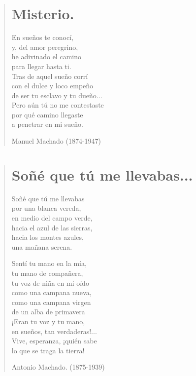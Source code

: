 \documentclass[12pt, twoside]{book}
\begin{document}
\begin{verse}
\begin{center}
\section{Misterio.}
\end{center}

En sueños te conocí,\\
y, del amor peregrino,\\
he adivinado el camino\\
para llegar hasta ti.\\
Tras de aquel sueño corrí\\
con el dulce y loco empeño\\
de ser tu esclavo y tu dueño...\\
Pero aún tú no me contestaste\\
por qué camino llegaste\\
a penetrar en mi sueño.\newline

Manuel Machado (1874-1947)

\end{verse}
\newpage

\begin{verse}
\begin{center}
\section{Soñé que tú me llevabas...}
\end{center}

Soñé que tú me llevabas\\
por una blanca vereda,\\
en medio del campo verde,\\
hacia el azul de las sierras,\\
hacia los montes azules,\\
una mañana serena.\newline

Sentí tu mano en la mía,\\
tu mano de compañera,\\
tu voz de niña en mi oído\\
como una campana nueva,\\
como una campana virgen\\
de un alba de primavera\\
¡Eran tu voz y tu mano,\\
en sueños, tan verdaderas!...\\
Vive, esperanza, ¡quién sabe\\
lo que se traga la tierra!\newline

Antonio Machado. (1875-1939)
\end{verse}
\newpage
\end{document}
